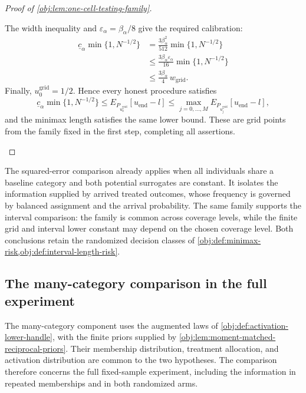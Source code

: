 \documentclass[11pt]{article}
\begin{document}
\begin{proof}[Proof of \cref{obj:lem:one-cell-testing-family}]
\begin{enumerate}
The width inequality and
\(\varepsilon_\alpha=\beta_\alpha/8\) give the required calibration:
\[
\begin{aligned}
\underline c_\alpha\min\{1,N^{-1/2}\}
&=
\frac{3\beta_\alpha^2}{512}
\min\{1,N^{-1/2}\}\\
&\le
\frac{3\beta_\alpha\varepsilon_\alpha}{16}
\min\{1,N^{-1/2}\}\\
&\le
\frac{3\beta_\alpha}{4}\,w_{\mathrm{grid}}.
\end{aligned}
\]
Finally, \(u_0^{\mathrm{grid}}=1/2\). Hence every honest procedure satisfies
\[
\underline c_\alpha\min\{1,N^{-1/2}\}
\le
E_{P_{u_0^{\mathrm{grid}}}}[u_{\mathrm{end}}-l]
\le
\max_{j=0,\ldots,M}E_{P_{u_j^{\mathrm{grid}}}}[u_{\mathrm{end}}-l],
\]
and the minimax length satisfies the same lower bound. These are grid points from the family fixed in the first step, completing all assertions.
\end{enumerate}
\end{proof}

The squared-error comparison already applies when all individuals share a baseline category and both potential surrogates are constant. It isolates the information supplied by arrived treated outcomes, whose frequency is governed by balanced assignment and the arrival probability. The same family supports the interval comparison: the family is common across coverage levels, while the finite grid and interval lower constant may depend on the chosen coverage level. Both conclusions retain the randomized decision classes of \cref{obj:def:minimax-risk,obj:def:interval-length-risk}.

\subsection{The many-category comparison in the full experiment}

The many-category component uses the augmented laws of \cref{obj:def:activation-lower-handle}, with the finite priors supplied by \cref{obj:lem:moment-matched-reciprocal-priors}. Their membership distribution, treatment allocation, and activation distribution are common to the two hypotheses. The comparison therefore concerns the full fixed-sample experiment, including the information in repeated memberships and in both randomized arms.
\end{document}
